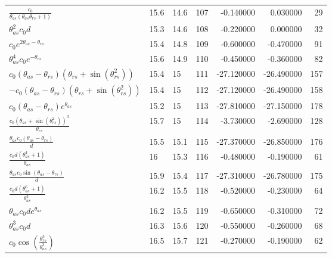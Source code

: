 \begin{tabularx}{\textwidth}{lllrrrr}
$ \displaystyle\frac{c_{0}}{\theta_{as} \left(\theta_{as} \theta_{rs} + 1\right)} $  &  15.6  &  14.6  &  107  &  -0.140000  &  0.030000  &  29  \\ 
$ \theta_{as}^{2} c_{0} d $  &  15.3  &  14.6  &  108  &  -0.220000  &  0.000000  &  32  \\ 
$ c_{0} e^{2 \theta_{as} - \theta_{rs}} $  &  15.4  &  14.8  &  109  &  -0.600000  &  -0.470000  &  91  \\ 
$ \theta_{as}^{4} c_{0} e^{- \theta_{rs}} $  &  15.6  &  14.9  &  110  &  -0.450000  &  -0.360000  &  82  \\ 
$ c_{0} \left(\theta_{as} - \theta_{rs}\right) \left(\theta_{rs} + \sin{\left(\theta_{rs}^{2} \right)}\right) $  &  15.4  &  15\phantom{.0}  &  111  &  -27.120000  &  -26.490000  &  157  \\ 
$ - c_{0} \left(\theta_{as} - \theta_{rs}\right) \left(\theta_{rs} + \sin{\left(\theta_{rs}^{2} \right)}\right) $  &  15.4  &  15\phantom{.0}  &  112  &  -27.120000  &  -26.490000  &  158  \\ 
$ c_{0} \left(\theta_{as} - \theta_{rs}\right) e^{\theta_{as}} $  &  15.2  &  15\phantom{.0}  &  113  &  -27.810000  &  -27.150000  &  178  \\ 
$ \displaystyle\frac{c_{0} \left(\theta_{as} + \sin{\left(\theta_{rs}^{2} \right)}\right)^{3}}{\theta_{rs}} $  &  15.7  &  15\phantom{.0}  &  114  &  -3.730000  &  -2.690000  &  128  \\ 
$ \displaystyle\frac{\theta_{as} c_{0} \left(\theta_{as} - \theta_{rs}\right)}{d} $  &  15.5  &  15.1  &  115  &  -27.370000  &  -26.850000  &  176  \\ 
$ \displaystyle\frac{c_{0} d \left(\theta_{as}^{4} + 1\right)}{\theta_{as}} $  &  16\phantom{.0}  &  15.3  &  116  &  -0.480000  &  -0.190000  &  61  \\ 
$ \displaystyle\frac{\theta_{as} c_{0} \sin{\left(\theta_{as} - \theta_{rs} \right)}}{d} $  &  15.9  &  15.4  &  117  &  -27.310000  &  -26.780000  &  175  \\ 
$ \displaystyle\frac{c_{0} d \left(\theta_{as}^{6} + 1\right)}{\theta_{as}^{3}} $  &  16.2  &  15.5  &  118  &  -0.520000  &  -0.230000  &  64  \\ 
$ \theta_{as} c_{0} d e^{\theta_{as}} $  &  16.2  &  15.5  &  119  &  -0.650000  &  -0.310000  &  72  \\ 
$ \theta_{as}^{3} c_{0} d $  &  16.3  &  15.6  &  120  &  -0.550000  &  -0.260000  &  68  \\ 
$ c_{0} \cos{\left(\displaystyle\frac{\theta_{rs}^{3}}{\theta_{as}^{3}} \right)} $  &  16.5  &  15.7  &  121  &  -0.270000  &  -0.190000  &  62  \\ 

\end{tabularx}
